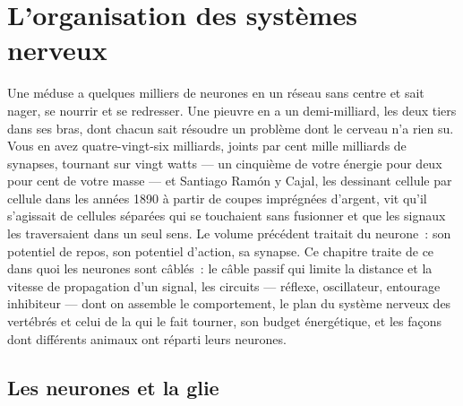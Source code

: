 \chapter{L'organisation des systèmes nerveux}\label{ch:b3:nervous-systems}

Une méduse a quelques milliers de neurones en un réseau sans centre et
sait nager, se nourrir et se redresser. Une pieuvre en a un demi-milliard,
les deux tiers dans ses bras, dont chacun sait résoudre un problème dont
le cerveau n'a rien su. Vous en avez quatre-vingt-six milliards, joints
par cent mille milliards de synapses, tournant sur vingt watts --- un
cinquième de votre énergie pour deux pour cent de votre masse --- et
Santiago Ramón y Cajal, les dessinant cellule par cellule dans les
années 1890 à partir de coupes imprégnées d'argent, vit qu'il s'agissait
de cellules séparées qui se touchaient sans fusionner et que les signaux
les traversaient dans un seul sens. Le volume précédent traitait du
neurone~: son potentiel de repos, son potentiel d'action, sa synapse. Ce
chapitre traite de ce dans quoi les neurones sont câblés~: le câble
passif qui limite la distance et la vitesse de propagation d'un signal,
les circuits --- réflexe, oscillateur, entourage inhibiteur --- dont on
assemble le comportement, le plan du système nerveux des vertébrés et
celui de la  qui le fait tourner, son budget énergétique, et les
façons dont différents animaux ont réparti leurs neurones.

\section{Les neurones et la glie}

